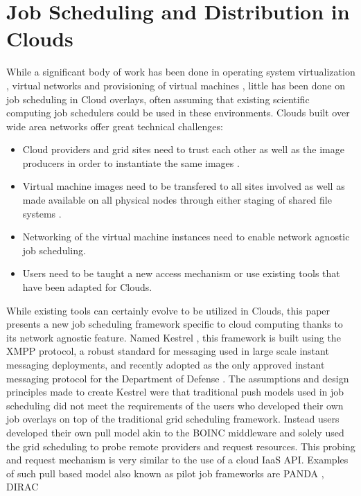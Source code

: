 \section{Job Scheduling and Distribution in Clouds}
While a significant body of work has been done in operating system
virtualization \cite{Barham2003}, virtual networks \cite{Tsugawa2006,Ganguly2006}
and provisioning of virtual machines \cite{Keahey2008,Sotomayor2009,Nurmi2009},
little has been done on job scheduling in Cloud overlays, often assuming
that existing scientific computing job schedulers could be used in
these environments. Clouds built over wide area networks offer great
technical challenges:
\begin{itemize}
\item Cloud providers and grid sites need to trust each other as well as
the image producers in order to instantiate the same images \cite{B'egin2008}.
\item Virtual machine images need to be transfered to all sites involved
as well as made available on all physical nodes through either staging
of shared file systems \cite{Schmidt2010}.
\item Networking of the virtual machine instances need to enable network
agnostic job scheduling.
\item Users need to be taught a new access mechanism or use existing tools
that have been adapted for Clouds.
\end{itemize}
While existing tools \cite{Tannenbaum2001,Deelman2009,Oinn2004,Wilde2009}
can certainly evolve to be utilized in Clouds, this paper presents
a new job scheduling framework specific to cloud computing thanks
to its network agnostic feature. Named Kestrel \cite{Stout2009,Stout10},
this framework is built using the XMPP protocol, a robust standard
for messaging used in large scale instant messaging deployments, and
recently adopted as the only approved instant messaging protocol for
the Department of Defense \cite{DoDXMPP}. The assumptions and design
principles made to create Kestrel were that traditional push models
used in job scheduling did not meet the requirements of the users
who developed their own job overlays on top of the traditional grid
scheduling framework. Instead users developed their own pull model
akin to the BOINC \cite{Anderson2004} middleware and solely used
the grid scheduling to probe remote providers and request resources.
This probing and request mechanism is very similar to the use of a
cloud IaaS API. Examples of such pull based model also known as pilot
job frameworks are PANDA \cite{Maeno2008}, DIRAC \cite{Tsaregorodtsev2004}
